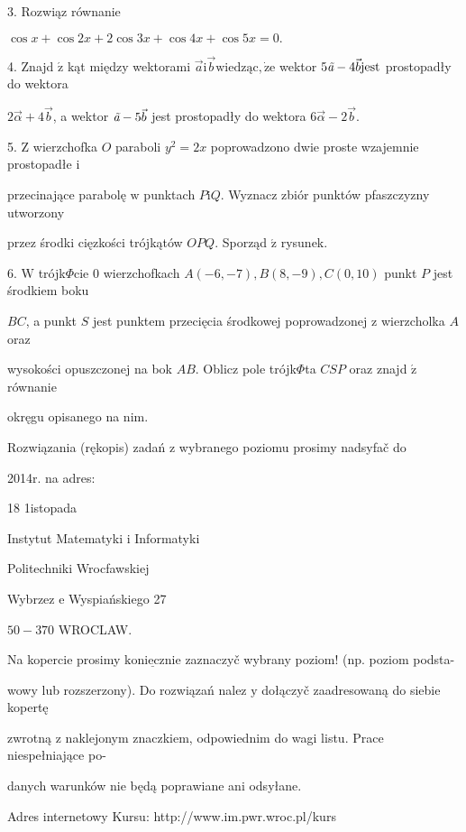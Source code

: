 \documentclass[a4paper,12pt]{article}
\begin{document}
3. Rozwiąz równanie

$\cos x+\cos 2x+2\cos 3x+\cos 4x+\cos 5x=0.$

4. Znajd $\acute{\mathrm{z}}$ kąt między wektorami $\vec{a}\mathrm{i}\vec{b}\mathrm{w}\mathrm{i}\mathrm{e}\mathrm{d}\mathrm{z}\text{ą} \mathrm{c}, \dot{\mathrm{z}}\mathrm{e}$ wektor $5\text{{\it ã}}-4\vec{b}\mathrm{j}\mathrm{e}\mathrm{s}\mathrm{t}$ prostopadły do wektora

$2\vec{\alpha}+4\vec{b}$, a wektor $\text{{\it ã}}-5\vec{b}$ jest prostopadły do wektora $6\vec{\alpha}-2\vec{b}.$

5. $\mathrm{Z}$ wierzchofka $O$ paraboli $y^{2}=2x$ poprowadzono dwie proste wzajemnie prostopadłe $\mathrm{i}$

przecinające parabolę $\mathrm{w}$ punktach $P\mathrm{i}Q$. Wyznacz zbiór punktów pfaszczyzny utworzony

przez środki cięzkości trójkątów $OPQ.$ Sporząd $\acute{\mathrm{z}}$ rysunek.

6. $\mathrm{W}$ trójk$\Phi$cie $0$ wierzchofkach $A(-6,-7), B(8,-9), C(0,10)$ punkt $P$ jest środkiem boku

$BC$, a punkt $S$ jest punktem przecięcia środkowej poprowadzonej $\mathrm{z}$ wierzcholka $A$ oraz

wysokości opuszczonej na bok $AB$. Oblicz pole trójk$\Phi$ta $CSP$ oraz znajd $\acute{\mathrm{z}}$ równanie

okręgu opisanego na nim.

Rozwiązania (rękopis) zadań z wybranego poziomu prosimy nadsyfač do

2014r. na adres:

18 1istopada

Instytut Matematyki $\mathrm{i}$ Informatyki

Politechniki Wrocfawskiej

Wybrzez $\mathrm{e}$ Wyspiańskiego 27

$50-370$ WROCLAW.

Na kopercie prosimy $\underline{\mathrm{k}\mathrm{o}\mathrm{n}\mathrm{i}\mathrm{e}\mathrm{c}\mathrm{z}\mathrm{n}\mathrm{i}\mathrm{e}}$ zaznaczyč wybrany poziom! (np. poziom podsta-

wowy lub rozszerzony). Do rozwiązań nalez $\mathrm{y}$ dołączyč zaadresowaną do siebie kopertę

zwrotną $\mathrm{z}$ naklejonym znaczkiem, odpowiednim do wagi listu. Prace niespełniające po-

danych warunków nie będą poprawiane ani odsyłane.

Adres internetowy Kursu: http://www.im.pwr.wroc.pl/kurs
\end{document}
